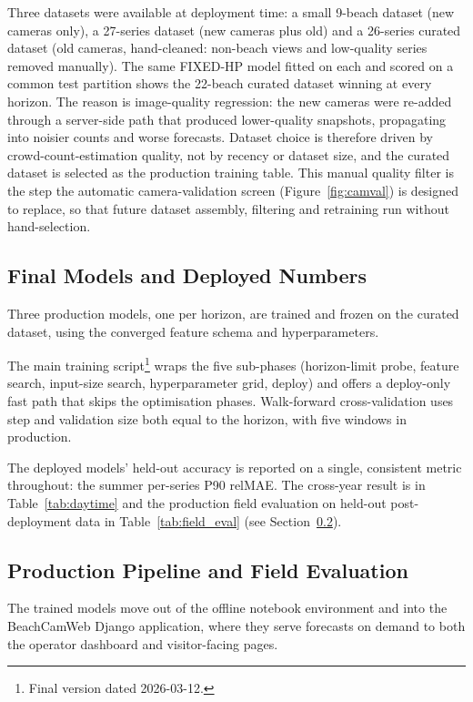 \documentclass[twocolumn,twoside,a4paper,10pt]{IEEEtran}
\begin{document}
Three datasets were available at deployment time: a small 9-beach dataset (new cameras only), a 27-series dataset (new cameras plus old) and a 26-series curated dataset (old cameras, hand-cleaned: non-beach views and low-quality series removed manually). The same FIXED-HP model fitted on each and scored on a common test partition shows the 22-beach curated dataset winning at every horizon. The reason is image-quality regression: the new cameras were re-added through a server-side path that produced lower-quality snapshots, propagating into noisier counts and worse forecasts. Dataset choice is therefore driven by crowd-count-estimation quality, not by recency or dataset size, and the curated dataset is selected as the production training table. This manual quality filter is the step the automatic camera-validation screen (Figure~\ref{fig:camval}) is designed to replace, so that future dataset assembly, filtering and retraining run without hand-selection.

\subsection{Final Models and Deployed Numbers}

Three production models, one per horizon, are trained and frozen on the curated dataset, using the converged feature schema and hyperparameters.

The main training script\footnote{Final version dated 2026-03-12.} wraps the five sub-phases (horizon-limit probe, feature search, input-size search, hyperparameter grid, deploy) and offers a deploy-only fast path that skips the optimisation phases. Walk-forward cross-validation uses step and validation size both equal to the horizon, with five windows in production.

The deployed models' held-out accuracy is reported on a single, consistent metric throughout: the summer per-series P90 relMAE. The cross-year result is in Table~\ref{tab:daytime} and the production field evaluation on held-out post-deployment data in Table~\ref{tab:field_eval} (see Section~\ref{sec:prod}).

\subsection{Production Pipeline and Field Evaluation}\label{sec:prod}

The trained models move out of the offline notebook environment and into the BeachCamWeb Django application, where they serve forecasts on demand to both the operator dashboard and visitor-facing pages.
\end{document}
